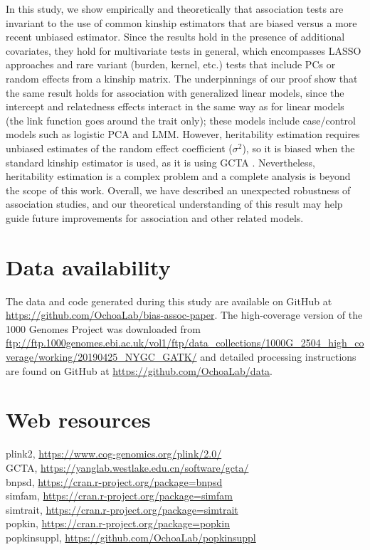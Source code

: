 \documentclass[9pt,twocolumn,twoside]{gsajnl}
\begin{document}
In this study, we show empirically and theoretically that association tests are invariant to the use of common kinship estimators that are biased versus a more recent unbiased estimator.
Since the results hold in the presence of additional covariates, they hold for multivariate tests in general, which encompasses LASSO approaches and rare variant (burden, kernel, etc.) tests that include PCs or random effects from a kinship matrix.
The underpinnings of our proof show that the same result holds for association with generalized linear models, since the intercept and relatedness effects interact in the same way as for linear models (the link function goes around the trait only); these models include case/control models such as logistic PCA and LMM.
However, heritability estimation requires unbiased estimates of the random effect coefficient ($\sigma^2$), so it is biased when the standard kinship estimator is used, as it is using GCTA \citep{yang_gcta:_2011, yang_advantages_2014}.
Nevertheless, heritability estimation is a complex problem and a complete analysis is beyond the scope of this work.
Overall, we have described an unexpected robustness of association studies, and our theoretical understanding of this result may help guide future improvements for association and other related models.

\section{Data availability}
The data and code generated during this study are available on GitHub at \url{https://github.com/OchoaLab/bias-assoc-paper}.
The high-coverage version of the 1000 Genomes Project was downloaded from \url{ftp://ftp.1000genomes.ebi.ac.uk/vol1/ftp/data_collections/1000G_2504_high_coverage/working/20190425_NYGC_GATK/}
and detailed processing instructions are found on GitHub at \url{https://github.com/OchoaLab/data}.

\section{Web resources}
plink2, \url{https://www.cog-genomics.org/plink/2.0/}\\
GCTA, \url{https://yanglab.westlake.edu.cn/software/gcta/}\\
bnpsd, \url{https://cran.r-project.org/package=bnpsd}\\
simfam, \url{https://cran.r-project.org/package=simfam}\\
simtrait, \url{https://cran.r-project.org/package=simtrait}\\
popkin, \url{https://cran.r-project.org/package=popkin}\\
popkinsuppl, \url{https://github.com/OchoaLab/popkinsuppl}
\end{document}
